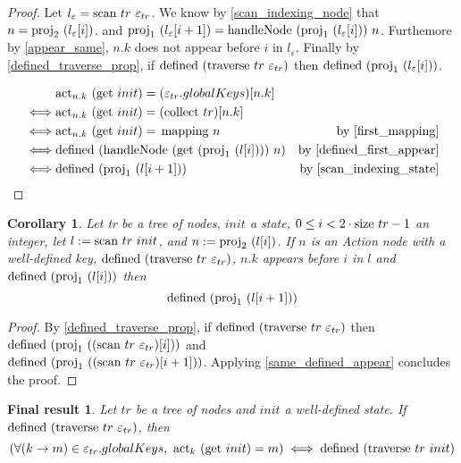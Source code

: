 \documentclass{article}
\newtheorem{corollary}[lemma]{Corollary}
\newtheorem*{res}{Final result}
\newcommand{\textfun}[1]{\textup{#1}}
\newcommand{\traverse}[2]{\textfun{traverse}\ #1\ #2}
\newcommand{\scan}[2]{\textfun{scan}\ #1\ #2}
\newcommand{\collect}[1]{\textfun{collect}\ #1}
\newcommand{\hNode}[2]{\textfun{handleNode}\ #1\ #2}
\newcommand{\defined}[1]{\textfun{defined}\ #1}
\newcommand{\get}[1]{\textfun{get}\ #1}
\newcommand{\mapping}[1]{\textfun{mapping}\ #1}
\newcommand{\size}[1]{\textfun{size}\ #1}
\newcommand{\fst}[1]{\textfun{proj}_1\ #1}
\newcommand{\snd}[1]{\textfun{proj}_2\ #1}
\newcommand{\actkey}[2]{\textfun{act}_{#1}\ #2}
\newcommand{\emptyState}[1]{\varepsilon_{#1}}
\begin{document}
\begin{proof}
    Let $l_{\varepsilon} = \scan{tr}{\emptyState{tr}}$. We know by \cref{scan_indexing_node} that $n = \snd{(l_{\varepsilon}[i])}$.
     and $\fst{(l_\varepsilon[i + 1])} = \hNode{(\fst{(l_\varepsilon[i])})}{n}$.
    Furthemore by \cref{appear_same}, $n.k$ does not appear before $i$ in $l_{\varepsilon}$. Finally by \cref{defined_traverse_prop}, if $\defined{(\traverse{tr}{\emptyState{tr}})}$ then $\defined{(\fst{(l_{\varepsilon}[i])})}$.
    
    \begin{align*}
        &\actkey{n.k}{(\get{init})} = (\emptyState{tr}.globalKeys)[n.k] \\
        \iff &\actkey{n.k}{(\get{init})} = (\collect{tr})[n.k] \\
        \iff &\actkey{n.k}{(\get{init})} =\, \mapping{n} &\text{by \cref{first_mapping}} \\
        \iff &\defined{(\hNode{(\get{(\fst{(l[i])})})}{n})} &\text{by \cref{defined_first_appear}}\\
        \iff &\defined{(\fst{(l[i + 1])})} &\text{by \cref{scan_indexing_state}}
    \end{align*}
\end{proof}

\begin{corollary}
    \label{defined_empty_traverse}
    Let tr be a tree of nodes, $init$ a state, $0 \leq i < 2\cdot \size{tr} - 1$ an integer, let $l := \scan{tr}{init}$, and $n := \snd{(l[i])}$. 
   If $n$ is an Action node with a well-defined key, $\defined{(\traverse{tr}{\emptyState{tr}})}$, $n.k$ appears before $i$ in $l$ and $\defined{(\fst{(l[i])})}$ then 
   \[\defined{(\fst{(l[i + 1])})}\]
\end{corollary}

\begin{proof}
    By \cref{defined_traverse_prop}, if $\defined{(\traverse{tr}{\emptyState{tr}})}$ then $\defined{(\fst{((\scan{tr}{\emptyState{tr}})[i])})}$ and \\
    $\defined{(\fst{((\scan{tr}{\emptyState{tr}})[i + 1])})}$. Applying \cref{same_defined_appear} concludes the proof.
\end{proof}


\begin{res}
    Let $tr$ be a tree of nodes and $init$ a well-defined state. If $\defined{(\traverse{tr}{\emptyState{tr}})}$, then
    \[ (\forall (k \to m) \in \emptyState{tr}.globalKeys,\ \actkey{k}{(\get{init})} = m) \iff \defined{(\traverse{tr}{init})}  \]  
\end{res}
\end{document}
